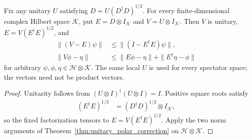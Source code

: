 \begin{theorem}
    \label{thm:unitary_polar_spectator}
    \leanok
    Fix any unitary $U$ satisfying $D=U(D^\dagger D)^{1/2}$.
    For every finite-dimensional complex Hilbert space $\mathcal K$, put
    $E=D\otimes I_{\mathcal K}$ and $V=U\otimes I_{\mathcal K}$.
    Then $V$ is unitary, $E=V(E^\dagger E)^{1/2}$, and
    \begin{align}
        \|(V-E)\psi\|  & \le\|(I-E^\dagger E)\psi\|,              \\
        \|V\phi-\eta\| & \le\|E\phi-\eta\|+\|E^\dagger\eta-\phi\|
    \end{align}
    for arbitrary $\psi,\phi,\eta\in\mathcal H\otimes\mathcal K$.
    The same local $U$ is used for every spectator space; the vectors
    need not be product vectors.
\end{theorem}
\begin{proof}
    \leanok
    Unitarity follows from
    $(U\otimes I)^\dagger(U\otimes I)=I$.
    Positive square roots satisfy
    \begin{align}
        (E^\dagger E)^{1/2}
         & =(D^\dagger D)^{1/2}\otimes I_{\mathcal K},
    \end{align}
    so the fixed factorization tensors to $E=V(E^\dagger E)^{1/2}$.
    Apply the two norm arguments of
    Theorem~\ref{thm:unitary_polar_correction} on
    $\mathcal H\otimes\mathcal K$.
\end{proof}
